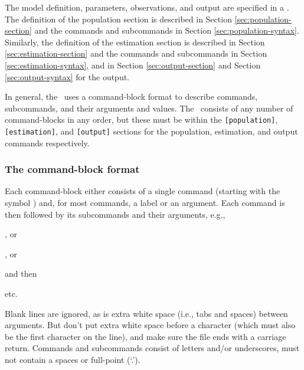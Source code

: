 The model definition, parameters, observations, and output are specified in a \config. The definition of the population section is described in Section \ref{sec:population-section} and the commands and subcommands in Section \ref{sec:population-syntax}. Similarly, the definition of the estimation section is described in Section \ref{sec:estimation-section} and the commands and subcommands in Section \ref{sec:estimation-syntax}, and in Section \ref{sec:output-section} and Section \ref{sec:output-syntax} for the output. 

In general, the \config\ uses a command-block format to describe commands, subcommands, and their arguments and values. The \config\ consists of any number of command-blocks in any order, but these must be within the \texttt{[population]}, \texttt{[estimation]}, and  \texttt{[output]} sections for the population, estimation, and output commands respectively. 

\subsubsection{The command-block format}

Each command-block either consists of a single command (starting with the symbol \@) and, for most commands, a label or an argument. Each command is then followed by its subcommands and their arguments, e.g., 

\begin{description}
\item {}, or 
\item {} , or
\item {} 
\end{description}

and then
\begin{description}
\item {} 
\item {} 
\item etc.
\end{description}

Blank lines are ignored, as is extra white space (i.e., tabs and spaces) between arguments. But don't put extra white space before a \command{} character (which must also be the first character on the line), and make sure the file ends with a carriage return. Commands and subcommands consist of letters and/or underscores, must not contain a spaces or full-point (`.').


